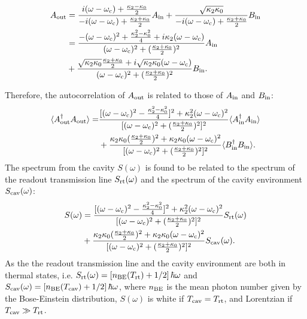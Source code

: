 \begin{equation} \label{eq:output_field}
\begin{split}
	 A_{\rm out} & =  \frac{i(\omega - \omega_{\rm c}) + \frac{\kappa_2-\kappa_0}{2}}{-i(\omega - \omega_{\rm c}) + \frac{\kappa_2+\kappa_0}{2}} A_{\rm in} + \frac{\sqrt{\kappa_2 \kappa_0}}{-i(\omega - \omega_{\rm c}) + \frac{\kappa_2+\kappa_0}{2}} B_{\rm in} \\
                           & = \frac{-(\omega-\omega_{\rm c})^2 + \frac{\kappa_2^2-\kappa_0^2}{4}+i\kappa_2(\omega-\omega_{\rm c})}{(\omega-\omega_{\rm c})^2+(\frac{\kappa_2+\kappa_0}{2})^2} A_{\rm in}  \\ & + \frac{\sqrt{\kappa_2\kappa_0}\frac{\kappa_2+\kappa_0}{2}+i\sqrt{\kappa_2\kappa_0}(\omega-\omega_{\rm c})}{(\omega-\omega_{\rm c})^2+(\frac{\kappa_2+\kappa_0}{2})^2} B_{\rm in}.
\end{split}
\end{equation}

Therefore, the autocorrelation of $A_{\rm out}$ is related to those of $A_{\rm in}$ and $B_{\rm in}$:
\begin{equation}
\label{eq:autocorrelation}
\begin{split}
    \langle A_{\rm out}^\dagger A_{\rm out} \rangle  = & \frac{[(\omega-\omega_{\rm c})^2 - \frac{\kappa_2^2-\kappa_0^2}{4}]^2+\kappa_2^2(\omega-\omega_{\rm c})^2}{[(\omega-\omega_{\rm c})^2+(\frac{\kappa_2+\kappa_0}{2})^2]^2} \langle A_{\rm in}^\dagger A_{\rm in} \rangle \\ & +  \frac{\kappa_2\kappa_0(\frac{\kappa_2+\kappa_0}{2})^2+\kappa_2\kappa_0(\omega-\omega_{\rm c})^2}{[(\omega-\omega_{\rm c})^2+(\frac{\kappa_2+\kappa_0}{2})^2]^2}\langle B_{\rm in}^\dagger B_{\rm in} \rangle.
\end{split}
\end{equation}
The spectrum from the cavity $S(\omega)$ is found to be related to the spectrum 
of the readout transmission line $S_{\rm rt}(\omega)$ and the spectrum of the 
cavity environment $S_{\rm cav}(\omega)$:
\begin{equation}
\label{eq:spectrum_relation}
\begin{split}
    S(\omega) & = \frac{[(\omega-\omega_{\rm c})^2 - \frac{\kappa_2^2-\kappa_0^2}{4}]^2+\kappa_2^2(\omega-\omega_{\rm c})^2}{[(\omega-\omega_{\rm c})^2+(\frac{\kappa_2+\kappa_0}{2})^2]^2} S_{\rm rt}(\omega) \\ & + \frac{\kappa_2\kappa_0(\frac{\kappa_2+\kappa_0}{2})^2+\kappa_2\kappa_0(\omega-\omega_{\rm c})^2}{[(\omega-\omega_{\rm c})^2+(\frac{\kappa_2+\kappa_0}{2})^2]^2}S_{\rm cav}(\omega).
\end{split}
\end{equation}
As the the readout transmission line and the cavity environment are both in 
thermal states, i.e. $S_{\rm rt}(\omega)=\left[n_{\rm BE}(T_{\rm rt})+1/2\right]\hbar\omega$ 
and $S_{\rm cav}(\omega)=\left[n_{\rm BE}(T_{\rm cav})+1/2\right]\hbar\omega$, where 
$n_{\rm BE}$ is the mean photon number given by the Bose-Einstein distribution, 
$S(\omega)$ is white if $T_{\rm cav}=T_{\rm rt}$, and Lorentzian if 
$T_{\rm cav} \gg T_{\rm rt}$.

